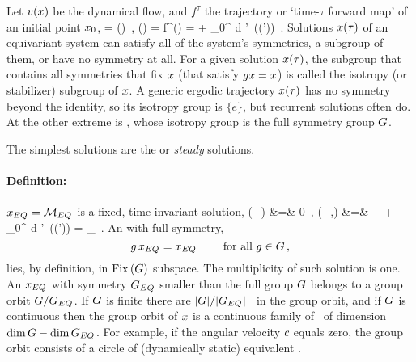 
Let $v(x)$ be the dynamical flow, and $f^\tau$ the
trajectory or  `time-$\tau$ forward map' of an initial point
${x_0}$,
\beq
{} = \vel(\ssp)
    \,, \qquad
    \ssp(\tau) = f^\tau(\xInit)
        = \xInit + \int_0^\tau \! d \tau'\,  \vel(\ssp(\tau'))
\,.
\label{symbolicNS}
\eeq
Solutions $x(\tau)$
of an equivariant system can satisfy all of
the system's symmetries, a subgroup of them, or
have no symmetry at all. For a given solution $x(\tau)$, the
subgroup that contains all symmetries that fix $x$ (that satisfy
$g x = x$) is called the isotropy (or stabilizer) subgroup of $x$.
A generic
ergodic trajectory $x(\tau)$ has no symmetry beyond the identity,
so its isotropy group is $\{e\}$,
but recurrent solutions often do. At the other extreme is
{\eqv}, whose isotropy group is the full symmetry
group $G$.

The  simplest solutions are the {\em \eqva} or {\em steady}
solutions.

\paragraph{Definition:
           \Eqv}
$x_{EQ_{}} = \mathcal{M}_{EQ_{}}$ is a fixed,
time-invariant solution,
\bea
\vel(\ssp_{\EQV{}}) &=& 0  \,,
    \continue
 \ssp(\ssp_{\EQV{}},\tau)
      &=& \ssp_{\EQV{}} + \int_0^\tau \! d \tau'\,  \vel(\ssp(\tau'))
       =  \ssp_{\EQV{}}
\,.
\label{eq:eqva}
\eea
An {\em \eqv} with full symmetry,
\[
g \, x_{EQ_{}}=x_{EQ_{}}
    \qquad \mbox{ for all } g \in G
\,,
\]
lies, by definition,  in $\mathrm{Fix}\left(G\right)$ subspace. The multiplicity of such solution is
one. An {\eqv} $x_{EQ_{}}$ with symmetry $G_{EQ_{}}$ smaller than
the full group $G$ belongs to a group orbit $G/G_{EQ_{}}$.
If $G$ is finite there are $|G|/|G_{EQ_{}}|$ \eqva\ in the
group orbit, and if $G$ is continuous then the group orbit of $x$
is a continuous family of \eqva\ of dimension $\dim G - \dim
G_{EQ_{}}$. For example, if the angular velocity $c$ equals
zero, the group orbit consists of a circle of (dynamically static)
equivalent \eqva.

